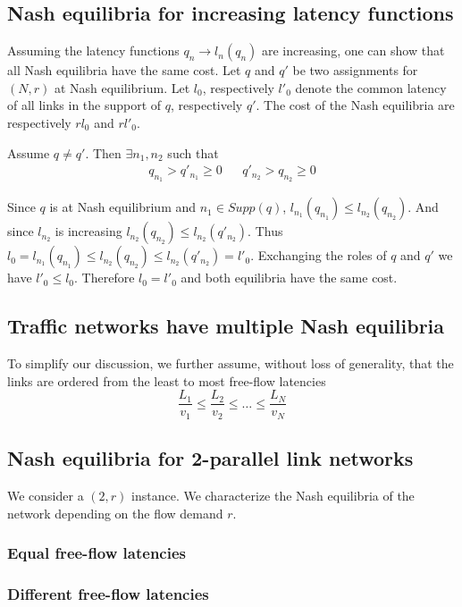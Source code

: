 \subsection{Nash equilibria for increasing latency functions}
Assuming the latency functions $q_n \rightarrow l_n(q_n)$ are increasing, one can show that all Nash equilibria have the same cost. Let $q$ and $q'$ be two assignments for $(N, r)$ at Nash equilibrium.  Let $l_0$, respectively $l'_0$ denote the common latency of all links in the support of $q$, respectively $q'$. The cost of the Nash equilibria are respectively $rl_0$ and $rl'_0$.

Assume $q \neq q'$. Then $\exists n_1, n_2$ such that
\begin{align*}
q_{n_1} > q'_{n_1} \geq 0 && q'_{n_2} > q_{n_2} \geq 0
\end{align*}

Since $q$ is at Nash equilibrium and $n_1 \in Supp(q)$, $l_{n_1}(q_{n_1}) \leq l_{n_2}(q_{n_2})$. And since $l_{n_2}$ is increasing $l_{n_2}(q_{n_2}) \leq l_{n_2}(q'_{n_2})$. Thus $l_0 = l_{n_1}(q_{n_1}) \leq l_{n_2}(q_{n_2}) \leq l_{n_2}(q'_{n_2}) = l'_0$. Exchanging the roles of $q$ and $q'$ we have $l'_0 \leq l_0$. Therefore $l_0 = l'_0$ and both equilibria have the same cost.

\subsection{Traffic networks have multiple Nash equilibria}
To simplify our discussion, we further assume, without loss of generality, that the links are ordered from the least to most free-flow latencies
\[
\frac{L_1}{v_1} \leq \frac{L_2}{v_2} \leq \dots \leq \frac{L_N}{v_N}
\]



\subsection{Nash equilibria for 2-parallel link networks}
We consider a $(2, r)$ instance. We characterize the Nash equilibria of the network depending on the flow demand $r$.

\subsubsection{Equal free-flow latencies}

\subsubsection{Different free-flow latencies}



